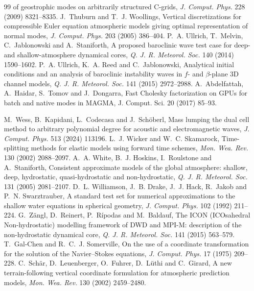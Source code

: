 \documentclass[preprint,12pt]{elsarticle}
\theoremstyle{definition}
\begin{document}
\begin{thebibliography}{99}
  of geostrophic modes on arbitrarily structured C-grids, \emph{J. Comput. Phys.} 228 (2009) 8321--8335.
 J.~Thuburn and T.~J. Woollings, Vertical discretizations for compressible Euler
  equation atmospheric models giving optimal representation of normal modes, \emph{J. Comput. Phys.} 203
  (2005) 386--404.
 P.~A. Ullrich, T.~Melvin, C.~Jablonowski and A.~Staniforth, A proposed baroclinic wave
  test case for deep- and shallow-atmosphere dynamical cores, \emph{Q. J. R. Meteorol. Soc.} 140 (2014)
  1590--1602.
 P.~A. Ullrich, K.~A. Reed and C.~Jablonowski, Analytical initial conditions and an
  analysis of baroclinic instability waves in $f$- and $\beta$-plane 3D channel models,
  \emph{Q. J. R. Meteorol. Soc.} 141 (2015) 2972--2988.
 A.~Abdelfattah, A.~Haidar, S.~Tomov and J.~Dongarra, Fast Cholesky factorization on
GPUs for batch and native modes in MAGMA, J. Comput. Sci. 20 (2017) 85--93.

 M.~Wess, B.~Kapidani, L.~Codecasa and J.~Sch\"oberl, Mass lumping the dual cell method to
  arbitrary polynomial degree for acoustic and electromagnetic waves, \emph{J. Comput. Phys.} 513 (2024)
  113196.
 L.~J. Wicker and W.~C. Skamarock, Time-splitting methods for elastic models
  using forward time schemes, \emph{Mon. Wea. Rev.} 130 (2002) 2088--2097.
 A.~A. White, B.~J. Hoskins, I.~Roulstone and A.~Staniforth, Consistent approximate models
  of the global atmosphere: shallow, deep, hydrostatic, quasi-hydrostatic and non-hydrostatic,
  \emph{Q. J. R. Meteorol. Soc.} 131 (2005) 2081--2107.
 D.~L. Williamson, J.~B. Drake, J.~J. Hack, R.~Jakob and P.~N. Swarztrauber, A standard
  test set for numerical approximations to the shallow water equations in spherical geometry,
  \emph{J. Comput. Phys.} 102 (1992) 211--224.
 G.~Z\"angl, D.~Reinert, P.~R\'ipodas and M.~Baldauf, The ICON (ICOsahedral
  Non-hydrostatic) modelling framework of DWD and MPI-M: description of the non-hydrostatic dynamical core,
  \emph{Q. J. R. Meteorol. Soc.} 141 (2015) 563--579.
 T.~Gal-Chen and R.~C.~J. Somerville, On the use of a coordinate transformation for the
  solution of the Navier--Stokes equations, \emph{J. Comput. Phys.} 17 (1975) 209--228.
 C.~Sch\"ar, D.~Leuenberger, O.~Fuhrer, D.~L\"uthi and C.~Girard, A new terrain-following
  vertical coordinate formulation for atmospheric prediction models, \emph{Mon. Wea. Rev.} 130 (2002)
  2459--2480.
\end{thebibliography}
\end{document}
